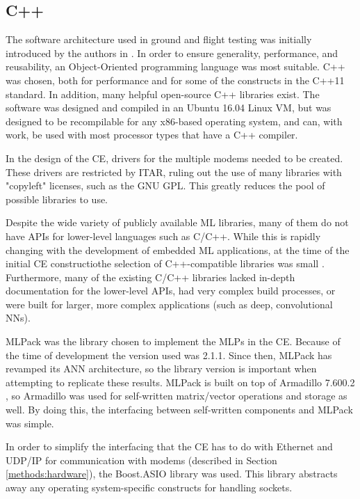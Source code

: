 \subsection{C++}
\par The software architecture used in ground and flight testing was initially introduced by the authors in \cite{tim_implementation_paper}. In order to ensure generality, performance, and reusability, an Object-Oriented programming language was most suitable. C++ was chosen, both for performance and for some of the constructs in the C++11 standard. In addition, many helpful open-source C++ libraries exist. The software was designed and compiled in an Ubuntu 16.04 Linux VM, but was designed to be recompilable for any x86-based operating system, and can, with work, be used with most processor types that have a C++ compiler.
\par In the design of the CE, drivers for the multiple modems needed to be created. These drivers are restricted by ITAR, ruling out the use of many libraries with "copyleft" licenses, such as the GNU GPL. This greatly reduces the pool of possible libraries to use. 
\par Despite the wide variety of publicly available ML libraries, many of them do not have APIs for lower-level languages such as C/C++. While this is rapidly changing with the development of embedded ML applications, at the time of the initial CE constructiothe selection of C++-compatible libraries was small \cite{tim_implementation_paper}. Furthermore, many of the existing C/C++ libraries lacked in-depth documentation for the lower-level APIs, had very complex build processes, or were built for larger, more complex applications (such as deep, convolutional NNs). 
\par MLPack \cite{mlpack_lib} was the library chosen to implement the MLPs in the CE. Because of the time of development the version used was 2.1.1. Since then, MLPack has revamped its ANN architecture, so the library version is important when attempting to replicate these results. MLPack is built on top of Armadillo 7.600.2 \cite{armadillo_lib}, so Armadillo was used for self-written matrix/vector operations and storage as well. By doing this, the interfacing between self-written components and MLPack was simple. 
\par In order to simplify the interfacing that the CE has to do with Ethernet and UDP/IP for communication with modems (described in Section \ref{methods:hardware}), the Boost.ASIO \cite{boost_libs} library was used. This library abstracts away any operating system-specific constructs for handling sockets.
